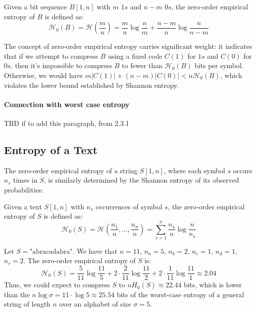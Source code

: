 \begin{definition}
    Given a bit sequence $B[1, n]$ with $m$ $1s$ and $n-m$ $0s$, the zero-order empirical entropy of $B$ is defined as:
    \begin{equation}
        \mathcal{H}_0(B) = \mathcal{H} \left( \frac{m}{n} \right) =\frac{m}{n} \log \frac{n}{m} + \frac{n-m}{n} \log \frac{n}{n-m}
    \end{equation}
\end{definition}
\noindent The concept of zero-order empirical entropy carries significant weight: it indicates that if we attempt to compress $B$ using a fixed code $C(1)$ for $1s$ and $C(0)$ for $0s$, then it's impossible to compress $B$ to fewer than $\mathcal{H}_0(B)$ bits per symbol. Otherwise, we would have $m |C(1)| + (n-m) |C(0)| < n \mathcal{H}_0(B)$, which violates the lower bound established by Shannon entropy.

\paragraph{Connection with worst case entropy}
TBD if to add this paragraph, from \cite{navarro2016compact} 2.3.1

\subsection{Entropy of a Text}

The zero-order empirical entropy of a string $S[1, n]$, where each symbol $s$ occurs $n_s$ times in $S$, is similarly determined by the Shannon entropy of its observed probabilities:

\begin{definition}
    Given a text $S[1, n]$ with $n_s$ occurrences of symbol $s$, the zero-order empirical entropy of $S$ is defined as:
    \begin{equation}
        \mathcal{H}_0(S) = \mathcal{H} \left( \frac{n_1}{n} , \ldots, \frac{n_{\sigma}}{n} \right) =  \sum_{s=1}^{\sigma} \frac{n_s}{n} \log \frac{n}{n_s}
    \end{equation}
\end{definition}

\begin{example}\label{ex:0_order_entropy_abracadabra}
    Let $S = \text{"abracadabra"}$. We have that $n = 11$, $n_a = 5$, $n_b = 2$, $n_c = 1$, $n_d = 1$, $n_r = 2$. The zero-order empirical entropy of $S$ is:
    \[
        \mathcal{H}_0(S) = \frac{5}{11} \log \frac{11}{5} + 2 \cdot \frac{2}{11} \log \frac{11}{2} + 2 \cdot \frac{1}{11} \log \frac{11}{1} \approx 2.04
    \]
    Thus, we could expect to compress $S$ to $n H_0 (S) \approx 22.44$ bits, which is lower than the $n \log \sigma  = 11 \cdot \log 5 \approx 25.54$ bits of the worst-case entropy of a general string of length $n$ over an alphabet of size $\sigma = 5$.
\end{example}

